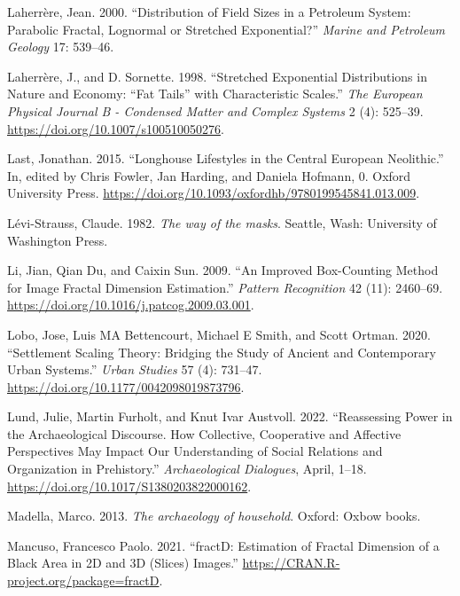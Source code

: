 \documentclass[
  12pt,
  a4paper, twoside]{book}
\newlength{\cslhangindent}
\newlength{\cslentryspacingunit} %
\newenvironment{CSLReferences}[2] %
 {%
  \setlength{\parindent}{0pt}
  \ifodd #1
  \let\oldpar\par
  \def\par{\hangindent=\cslhangindent\oldpar}
  \fi
  \setlength{\parskip}{#2\cslentryspacingunit}
 }%
 {}
\begin{document}
\begin{CSLReferences}{1}{0}
\leavevmode{}%
Laherrère, Jean. 2000. {``Distribution of Field Sizes in a Petroleum System: Parabolic Fractal, Lognormal or Stretched Exponential?''} \emph{Marine and Petroleum Geology} 17: 539--46.

\leavevmode{}%
Laherrère, J., and D. Sornette. 1998. {``Stretched Exponential Distributions in Nature and Economy: {``}Fat Tails{''} with Characteristic Scales.''} \emph{The European Physical Journal B - Condensed Matter and Complex Systems} 2 (4): 525--39. \url{https://doi.org/10.1007/s100510050276}.

\leavevmode{}%
Last, Jonathan. 2015. {``Longhouse Lifestyles in the Central European Neolithic.''} In, edited by Chris Fowler, Jan Harding, and Daniela Hofmann, 0. Oxford University Press. \url{https://doi.org/10.1093/oxfordhb/9780199545841.013.009}.

\leavevmode{}%
Lévi-Strauss, Claude. 1982. \emph{The way of the masks}. Seattle, Wash: University of Washington Press.

\leavevmode{}%
Li, Jian, Qian Du, and Caixin Sun. 2009. {``An Improved Box-Counting Method for Image Fractal Dimension Estimation.''} \emph{Pattern Recognition} 42 (11): 2460--69. \url{https://doi.org/10.1016/j.patcog.2009.03.001}.

\leavevmode{}%
Lobo, Jose, Luis MA Bettencourt, Michael E Smith, and Scott Ortman. 2020. {``Settlement Scaling Theory: Bridging the Study of Ancient and Contemporary Urban Systems.''} \emph{Urban Studies} 57 (4): 731--47. \url{https://doi.org/10.1177/0042098019873796}.

\leavevmode{}%
Lund, Julie, Martin Furholt, and Knut Ivar Austvoll. 2022. {``Reassessing Power in the Archaeological Discourse. How Collective, Cooperative and Affective Perspectives May Impact Our Understanding of Social Relations and Organization in Prehistory.''} \emph{Archaeological Dialogues}, April, 1--18. \url{https://doi.org/10.1017/S1380203822000162}.

\leavevmode{}%
Madella, Marco. 2013. \emph{The archaeology of household}. Oxford: Oxbow books.

\leavevmode{}%
Mancuso, Francesco Paolo. 2021. {``fractD: Estimation of Fractal Dimension of a Black Area in 2D and 3D (Slices) Images.''} \url{https://CRAN.R-project.org/package=fractD}.


\end{CSLReferences}
\end{document}
